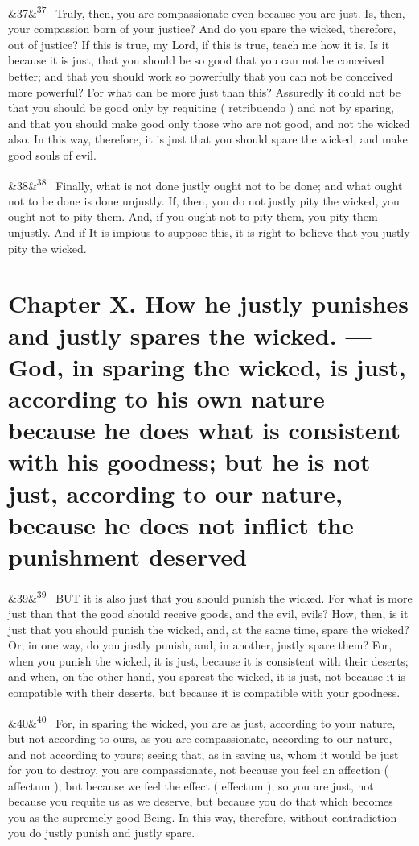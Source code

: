 \documentclass[12pt]{article}
\newcommand{\para}[1][]{\par\noindent\ifx&#1&\else\textsuperscript{\footnotesize #1}~\fi}
\begin{document}
\para[37] Truly, then, you are compassionate even because you are just. Is, then, your compassion born of your justice? And do you spare the wicked, therefore, out of justice? If this is true, my Lord, if this is true, teach me how it is. Is it because it is just, that you should be so good that you can not be conceived better; and that you should work so powerfully that you can not be conceived more powerful? For what can be more just than this? Assuredly it could not be that you should be good only by requiting ( retribuendo ) and not by sparing, and that you should make good only those who are not good, and not the wicked also. In this way, therefore, it is just that you should spare the wicked, and make good souls of evil.

\para[38] Finally, what is not done justly ought not to be done; and what ought not to be done is done unjustly. If, then, you do not justly pity the wicked, you ought not to pity them. And, if you ought not to pity them, you pity them unjustly. And if It is impious to suppose this, it is right to believe that you justly pity the wicked.


\section*{Chapter X. How he justly punishes and justly spares the wicked. ---God, in sparing the wicked, is just, according to his own nature because he does what is consistent with his goodness; but he is not just, according to our nature, because he does not inflict the punishment deserved}

\para[39] BUT it is also just that you should punish the wicked. For what is more just than that the good should receive goods, and the evil, evils? How, then, is it just that you should punish the wicked, and, at the same time, spare the wicked? Or, in one way, do you justly punish, and, in another, justly spare them? For, when you punish the wicked, it is just, because it is consistent with their deserts; and when, on the other hand, you sparest the wicked, it is just, not because it is compatible with their deserts, but because it is compatible with your goodness.

\para[40] For, in sparing the wicked, you are as just, according to your nature, but not according to ours, as you are compassionate, according to our nature, and not according to yours; seeing that, as in saving us, whom it would be just for you to destroy, you are compassionate, not because you feel an affection ( affectum ), but because we feel the effect ( effectum ); so you are just, not because you requite us as we deserve, but because you do that which becomes you as the supremely good Being. In this way, therefore, without contradiction you do justly punish and justly spare.
\end{document}
